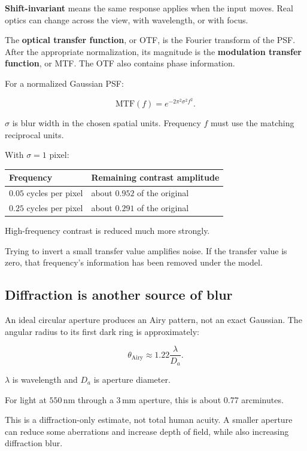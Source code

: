 \textbf{Shift-invariant} means the same response applies when the input moves. Real optics can change across the view, with wavelength, or with focus.

The \textbf{optical transfer function}, or OTF, is the Fourier transform of the PSF. After the appropriate normalization, its magnitude is the \textbf{modulation transfer function}, or MTF. The OTF also contains phase information.

For a normalized Gaussian PSF:

\[
\mathrm{MTF}(f)=e^{-2\pi^2\sigma^2f^2}.
\]

\(\sigma\) is blur width in the chosen spatial units. Frequency \(f\) must use the matching reciprocal units.

With \(\sigma=1\) pixel:

{\def\LTcaptype{none} %
\begin{longtable}[]{@{}ll@{}}
\toprule\noalign{}
Frequency & Remaining contrast amplitude \\
\midrule\noalign{}
\endhead
\bottomrule\noalign{}
\endlastfoot
\(0.05\) cycles per pixel & about \(0.952\) of the original \\
\(0.25\) cycles per pixel & about \(0.291\) of the original \\
\end{longtable}
}

High-frequency contrast is reduced much more strongly.

Trying to invert a small transfer value amplifies noise. If the transfer value is zero, that frequency's information has been removed under the model.

\subsection{Diffraction is another source of blur}\label{04-visual-computing-ii-ch043-diffraction-is-another-source-of-blur}

An ideal circular aperture produces an Airy pattern, not an exact Gaussian. The angular radius to its first dark ring is approximately:

\[
\theta_{\mathrm{Airy}}\approx1.22\frac{\lambda}{D_a}.
\]

\(\lambda\) is wavelength and \(D_a\) is aperture diameter.

For light at \(550\,\mathrm{nm}\) through a \(3\,\mathrm{mm}\) aperture, this is about 0.77 arcminutes.

This is a diffraction-only estimate, not total human acuity. A smaller aperture can reduce some aberrations and increase depth of field, while also increasing diffraction blur.

